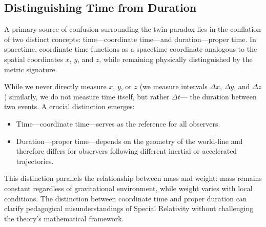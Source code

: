 \documentclass[a4paper,fleqn]{cas-sc}
\begin{document}
	\subsection{Distinguishing Time from Duration}\label{subsec3_1}
    	A primary source of confusion surrounding the twin paradox lies in the conflation of two distinct concepts: time—coordinate time—and duration—proper time. In spacetime, coordinate time functions as a spacetime coordinate analogous to the spatial coordinates  $x$, $y$, and $z$, while remaining physically distinguished by the metric signature.
	
	While we never directly measure $x$, $y$, or $z$ (we measure intervals $\Delta x$, $\Delta y$, and $\Delta z$) similarly, we do not measure time itself, but rather  $\Delta t$— the duration between two events.
	A crucial distinction emerges:
		\begin{itemize}
			\item Time—coordinate time—serves as the reference for all observers.
			\item Duration—proper time—depends on the geometry of the world-line and therefore differs for observers following different inertial or accelerated trajectories.
		\end{itemize}
    	This distinction parallels the relationship between mass and weight: mass remains constant regardless of gravitational environment, while weight varies with local conditions. The distinction between coordinate time and proper duration can clarify pedagogical misunderstandings of Special Relativity without challenging the theory's mathematical framework.
\end{document}
